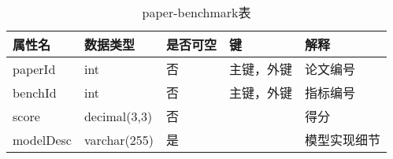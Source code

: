 \begin{table}[htbp!]
    \centering
    \caption{paper-benchmark表}
    \begin{tabular}{|l|l|l|l|l|}
    \hline
        属性名 & 数据类型 & 是否可空 & 键 & 解释 \\ \hline
        paperId & int & 否 & 主键，外键 & 论文编号 \\ \hline
        benchId & int & 否 & 主键，外键 & 指标编号 \\ \hline
        score & decimal(3,3) & 否 &  & 得分 \\ \hline
        modelDesc & varchar(255) & 是 &  & 模型实现细节 \\ \hline
    \end{tabular}
    \label{tab:paper-benchmark}
\end{table}

